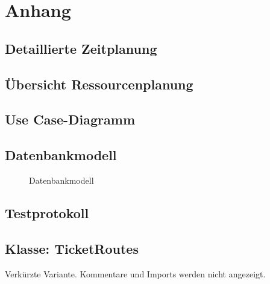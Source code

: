 \section{Anhang}
\subsection{Detaillierte Zeitplanung}
\label{app:Zeitplanung}


\subsection{Übersicht Ressourcenplanung}
\label{app:Ressourcenplanung}



\clearpage

\subsection{Use Case-Diagramm}
\label{app:UseCase}




\subsection{Datenbankmodell}
\label{app:Datenbankmodell}

\begin{figure}[htb]
\centering
{}
\caption{Datenbankmodell}
\end{figure}
\clearpage




\subsection{Testprotokoll}
\label{app:test}
\clearpage
{}
\clearpage

\subsection{Klasse: TicketRoutes}
\label{app:CNMI}
Verkürzte Variante. Kommentare und Imports werden nicht angezeigt.

\clearpage

